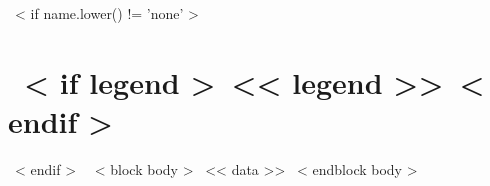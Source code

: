 ~< if name.lower() != 'none' >~
\section{~< if legend >~\hfill{\normalsize\normalfont<< legend >>}~< endif >~}
~< endif >~
  ~< block body >~
    << data >>
  ~< endblock body >~
